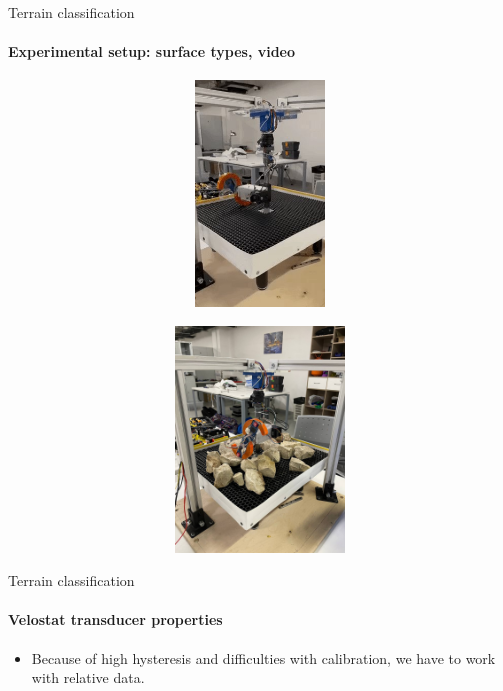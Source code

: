 \documentclass[aspectratio=169,xcolor=table]{beamer}
\begin{document}
\begin{frame}[t]{Terrain classification}
    \framesubtitle{Experimental setup: surface types, video}
    \vspace{-15pt}
    \begin{figure}[H]
        \begin{subfigure}{0.49\textwidth}
            \href{https://gifyu.com/image/SxatY}
            {\centering\includegraphics[height=6cm,width=1\textwidth,keepaspectratio]{s_shape_leg/flat.jpg}}
        \end{subfigure}
        \hfill
        \begin{subfigure}{0.49\textwidth}
            \href{https://gifyu.com/image/Sxatt}
            {\centering\includegraphics[height=6cm,width=1\textwidth,keepaspectratio]{s_shape_leg/view.jpg}}
        \end{subfigure}
    \end{figure}
\end{frame}

\begin{frame}[t]{Terrain classification}
    \framesubtitle{Velostat transducer properties}
    \large
    \begin{itemize}
        \item Because of high hysteresis and difficulties with calibration, we have to work with relative data.
    \end{itemize}

\end{frame}
\end{document}

